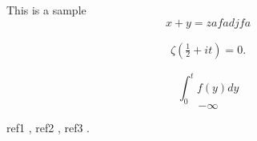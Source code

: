 \documentclass{article}
\begin{document}
This is a sample
\begin{equation}
    x + y = zafadjfa
\end{equation}

\begin{align}
    \zeta(\frac{1}{2}+i t) = 0.
\end{align}

$$
\int_0^t f(y) dy
$$
\[
    -\infty
\]

ref1 \cite{KyTea}, ref2  \cite{DUMMY:1}, ref3 \cite{Nobody06}.

{}

\end{document}
